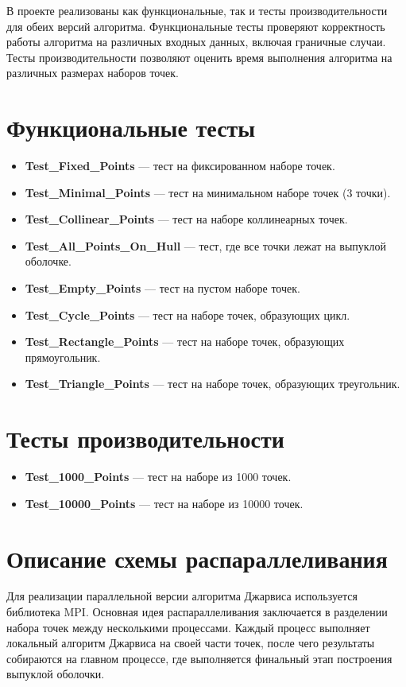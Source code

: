 \documentclass[12pt]{article}
\begin{document}
В проекте реализованы как функциональные, так и тесты производительности для обеих версий алгоритма. Функциональные тесты проверяют корректность работы алгоритма на различных входных данных, включая граничные случаи. Тесты производительности позволяют оценить время выполнения алгоритма на различных размерах наборов точек.

\section*{Функциональные тесты}

\begin{itemize}
\item \textbf{Test\_Fixed\_Points} — тест на фиксированном наборе точек.
\item \textbf{Test\_Minimal\_Points} — тест на минимальном наборе точек (3 точки).
\item \textbf{Test\_Collinear\_Points} — тест на наборе коллинеарных точек.
\item \textbf{Test\_All\_Points\_On\_Hull} — тест, где все точки лежат на выпуклой оболочке.
\item \textbf{Test\_Empty\_Points} — тест на пустом наборе точек.
\item \textbf{Test\_Cycle\_Points} — тест на наборе точек, образующих цикл.
\item \textbf{Test\_Rectangle\_Points} — тест на наборе точек, образующих прямоугольник.
\item \textbf{Test\_Triangle\_Points} — тест на наборе точек, образующих треугольник.
\end{itemize}

\section*{Тесты производительности}

\begin{itemize}
\item \textbf{Test\_1000\_Points} — тест на наборе из 1000 точек.
\item \textbf{Test\_10000\_Points} — тест на наборе из 10000 точек.
\end{itemize}

\section*{Описание схемы распараллеливания}

Для реализации параллельной версии алгоритма Джарвиса используется библиотека MPI. Основная идея распараллеливания заключается в разделении набора точек между несколькими процессами. Каждый процесс выполняет локальный алгоритм Джарвиса на своей части точек, после чего результаты собираются на главном процессе, где выполняется финальный этап построения выпуклой оболочки.
\end{document}
